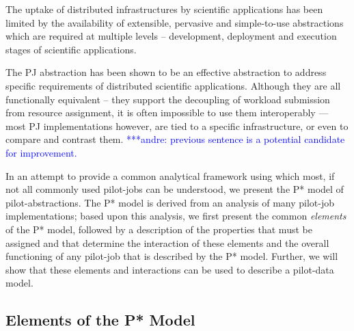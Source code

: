 \documentclass[conference,final]{IEEEtran}
\newcommand{\alnote}[1]{ {\textcolor{blue} { ***andre: #1 }}}
\newcommand{\alnote}[1]{}
\newcommand{\upp}{\vspace*{-0.5em}}
\begin{document}


The uptake of distributed infrastructures by scientific
applications has been limited by the availability of extensible,
pervasive and simple-to-use abstractions which are required at
multiple levels – development, deployment and execution stages of
scientific applications.


The PJ abstraction has been shown to be an effective
abstraction to address specific requirements of distributed scientific
applications. Although they are all functionally equivalent -- they
support the decoupling of workload submission from resource
assignment, it is often impossible to use them interoperably --- most
PJ implementations however, are tied to a specific
infrastructure, or even to compare and contrast them.\alnote{previous sentence
is a potential candidate for improvement.}

In an attempt to provide a common analytical framework using which
most, if not all commonly used pilot-jobs can be understood, we
present the P* model of pilot-abstractions. The P* model is derived
from an analysis of many pilot-job implementations; based upon this analysis, we
first present the common {\it elements} of the P* model, followed by
a description of the properties that must be assigned and that
determine the interaction of these elements and the overall functioning of any
pilot-job that is described by the P* model. Further, we will show that these
elements and interactions can be used to describe a pilot-data model.

\subsection{Elements of the P* Model \upp\upp}
\end{document}
